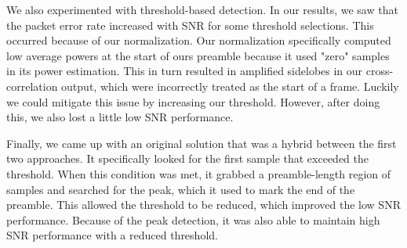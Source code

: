 \documentclass{article}
\begin{document}
We also experimented with threshold-based detection. In our results, we saw that the packet error rate increased with SNR for some threshold selections. This occurred because of our normalization. Our normalization specifically computed low average powers at the start of ours preamble because it used "zero" samples in its power estimation. This in turn resulted in amplified sidelobes in our cross-correlation output, which were incorrectly treated as the start of a frame. Luckily we could mitigate this issue by increasing our threshold. However, after doing this, we also lost a little low SNR performance.

Finally, we came up with an original solution that was a hybrid between the first two approaches. It specifically looked for the first sample that exceeded the threshold. When this condition was met, it grabbed a preamble-length region of samples and searched for the peak, which it used to mark the end of the preamble. This allowed the threshold to be reduced, which improved the low SNR performance. Because of the peak detection, it was also able to maintain high SNR performance with a reduced threshold.


{}
\end{document}
